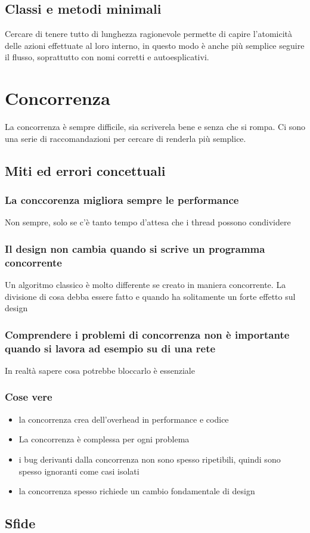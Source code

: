 \documentclass[11pt,a4paper]{book}
\begin{document}
\section{Classi e metodi minimali}
Cercare di tenere tutto di lunghezza ragionevole permette di capire l'atomicità delle azioni effettuate al loro interno, in questo modo è anche più semplice seguire il flusso, soprattutto con nomi corretti e autoesplicativi.

\chapter{Concorrenza}
La concorrenza è sempre difficile, sia scriverela bene e senza che si rompa. Ci sono una serie di raccomandazioni per cercare di renderla più semplice.

\section{Miti ed errori concettuali}
\subsection{La conccorenza migliora sempre le performance}
Non sempre, solo se c'è tanto tempo d'attesa che i thread possono condividere

\subsection{Il design non cambia quando si scrive un programma concorrente}
Un algoritmo classico è molto differente se creato in maniera concorrente. La divisione di cosa debba essere fatto e quando ha solitamente un forte effetto sul design

\subsection{Comprendere i problemi di concorrenza non è importante quando si lavora ad esempio su di una rete}
In realtà sapere cosa potrebbe bloccarlo è essenziale

\subsection{Cose vere}
\begin{itemize}
	\item la concorrenza crea dell'overhead in performance e codice
	\item La concorrenza è complessa per ogni problema
	\item i bug derivanti dalla concorrenza non sono spesso ripetibili, quindi sono spesso ignoranti come casi isolati
	\item la concorrenza spesso richiede un cambio fondamentale di design
\end{itemize}

\section{Sfide}
\end{document}
